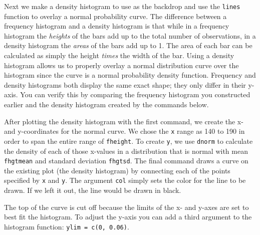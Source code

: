\documentclass[]{book}
\newenvironment{Shaded}{\begin{snugshade}}{\end{snugshade}}
\newcommand{\KeywordTok}[1]{\textcolor[rgb]{0.13,0.29,0.53}{\textbf{{#1}}}}
\newcommand{\DataTypeTok}[1]{\textcolor[rgb]{0.13,0.29,0.53}{{#1}}}
\newcommand{\DecValTok}[1]{\textcolor[rgb]{0.00,0.00,0.81}{{#1}}}
\newcommand{\StringTok}[1]{\textcolor[rgb]{0.31,0.60,0.02}{{#1}}}
\newcommand{\OtherTok}[1]{\textcolor[rgb]{0.56,0.35,0.01}{{#1}}}
\newcommand{\NormalTok}[1]{{#1}}
\theoremstyle{definition}
\theoremstyle{definition}
\theoremstyle{remark}
\begin{document}
Next we make a density histogram to use as the backdrop and use the
\texttt{lines} function to overlay a normal probability curve. The
difference between a frequency histogram and a density histogram is that
while in a frequency histogram the \emph{heights} of the bars add up to
the total number of observations, in a density histogram the
\emph{areas} of the bars add up to 1. The area of each bar can be
calculated as simply the height \emph{times} the width of the bar. Using
a density histogram allows us to properly overlay a normal distribution
curve over the histogram since the curve is a normal probability density
function. Frequency and density histograms both display the same exact
shape; they only differ in their y-axis. You can verify this by
comparing the frequency histogram you constructed earlier and the
density histogram created by the commands below.

\begin{Shaded}
\end{Shaded}

After plotting the density histogram with the first command, we create
the x- and y-coordinates for the normal curve. We chose the \texttt{x}
range as 140 to 190 in order to span the entire range of
\texttt{fheight}. To create \texttt{y}, we use \texttt{dnorm} to
calculate the density of each of those x-values in a distribution that
is normal with mean \texttt{fhgtmean} and standard deviation
\texttt{fhgtsd}. The final command draws a curve on the existing plot
(the density histogram) by connecting each of the points specified by
\texttt{x} and \texttt{y}. The argument \texttt{col} simply sets the
color for the line to be drawn. If we left it out, the line would be
drawn in black.

The top of the curve is cut off because the limits of the x- and y-axes
are set to best fit the histogram. To adjust the y-axis you can add a
third argument to the histogram function: \texttt{ylim\ =\ c(0,\ 0.06)}.
\end{document}
